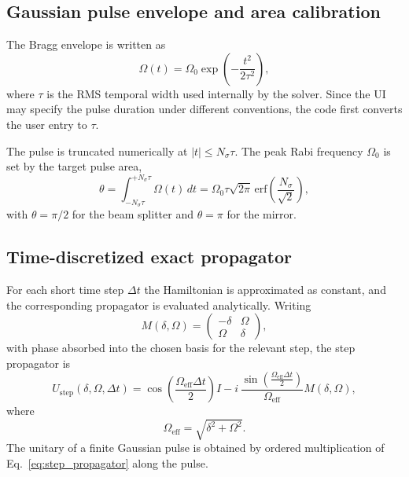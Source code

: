 \documentclass[11pt]{article}
\begin{document}
\subsection{Gaussian pulse envelope and area calibration}
The Bragg envelope is written as
\begin{equation}
\Omega(t)=\Omega_0\exp\!\left(-\frac{t^2}{2\tau^2}\right),
\label{eq:gaussian_envelope}
\end{equation}
where $\tau$ is the RMS temporal width used internally by the solver. Since the UI may specify the pulse duration under different conventions, the code first converts the user entry to $\tau$.

The pulse is truncated numerically at $|t|\le N_\sigma\tau$. The peak Rabi frequency $\Omega_0$ is set by the target pulse area,
\begin{equation}
\theta
=
\int_{-N_\sigma \tau}^{+N_\sigma \tau}\Omega(t)\,dt
=
\Omega_0\tau\sqrt{2\pi}\,\mathrm{erf}\!\left(\frac{N_\sigma}{\sqrt{2}}\right),
\label{eq:pulse_area}
\end{equation}
with $\theta=\pi/2$ for the beam splitter and $\theta=\pi$ for the mirror.

\subsection{Time-discretized exact propagator}
For each short time step $\Delta t$ the Hamiltonian is approximated as constant, and the corresponding propagator is evaluated analytically. Writing
\begin{equation}
M(\delta,\Omega)=
\begin{pmatrix}
-\delta & \Omega \\
\Omega & \delta
\end{pmatrix},
\end{equation}
with phase absorbed into the chosen basis for the relevant step, the step propagator is
\begin{equation}
U_{\mathrm{step}}(\delta,\Omega,\Delta t)
=
\cos\!\left(\frac{\Omega_{\mathrm{eff}}\Delta t}{2}\right)I
-
i\,\frac{\sin\!\left(\frac{\Omega_{\mathrm{eff}}\Delta t}{2}\right)}{\Omega_{\mathrm{eff}}}
M(\delta,\Omega),
\label{eq:step_propagator}
\end{equation}
where
\begin{equation}
\Omega_{\mathrm{eff}}=\sqrt{\delta^2+\Omega^2}.
\end{equation}
The unitary of a finite Gaussian pulse is obtained by ordered multiplication of Eq.~\eqref{eq:step_propagator} along the pulse.
\end{document}
